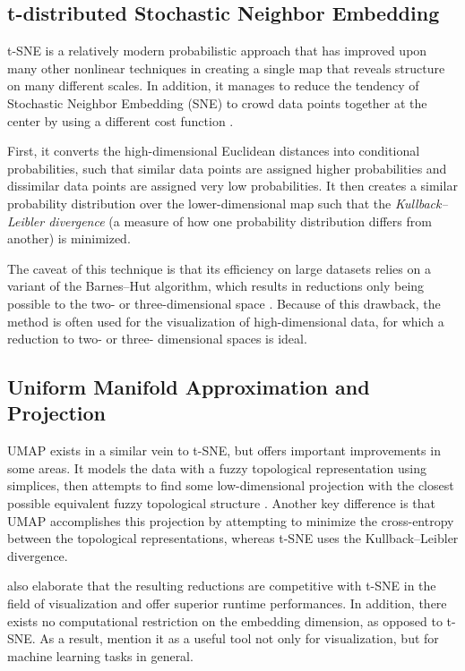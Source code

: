 \documentclass[english,bachelor,ul]{webisthesis} %
\begin{document}
\subsection*{t-distributed Stochastic Neighbor Embedding}

t-SNE is a relatively modern probabilistic approach that has improved upon many other nonlinear techniques in creating a single map that reveals structure on many different scales. In addition, it manages to reduce the tendency of Stochastic Neighbor Embedding (SNE) to crowd data points together at the center by using a different cost function \citep{van2008visualizing}. 

First, it converts the high-dimensional Euclidean distances into conditional probabilities, such that similar data points are assigned higher probabilities and dissimilar data points are assigned very low probabilities. It then creates a similar probability distribution over the lower-dimensional map such that the \textit{Kullback--Leibler divergence} (a measure of how one probability distribution differs from another) is minimized. 

The caveat of this technique is that its efficiency on large datasets relies on a variant of the Barnes--Hut algorithm, which results in reductions only being possible to the two- or three-dimensional space \citep{DBLP:journals/corr/abs-1301-3342}. Because of this drawback, the method is often used for the visualization of high-dimensional data, for which a reduction to two- or three- dimensional spaces is ideal.

\subsection*{Uniform Manifold Approximation and Projection}

UMAP exists in a similar vein to t-SNE, but offers important improvements in some areas. It models the data with a fuzzy topological representation using simplices, then attempts to find some low-dimensional projection with the closest possible equivalent fuzzy topological structure \citep{DBLP:journals/corr/abs-1802-03426}. Another key difference is that UMAP accomplishes this projection by attempting to minimize the cross-entropy between the topological representations, whereas t-SNE uses the Kullback--Leibler divergence. 

\cite{DBLP:journals/corr/abs-1802-03426} also elaborate that the resulting reductions are competitive with t-SNE in the field of visualization and offer superior runtime performances. In addition, there exists no computational restriction on the embedding dimension, as opposed to t-SNE. As a result, \cite{DBLP:journals/corr/abs-1802-03426} mention it as a useful tool not only for visualization, but for machine learning tasks in general.
\end{document}
